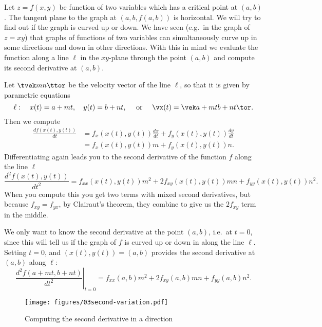 Let $z=f(x, y)$ be function of two variables which has a critical point at
$(a,b)$.  The tangent plane to the graph at $(a,b,f(a,b))$ is horizontal.
We will try to find out if the graph is curved up or down.  We have seen
(e.g.\ in the graph of $z=xy$) that graphs of functions of two variables
can simultaneously curve up in some directions and down in other
directions.
With this in mind we evaluate the function along a line $\ell$ in the
$xy$-plane through the point $(a,b)$ and compute its second derivative
at $(a,b)$.  

Let $\tvek m\\ n\ttor$ be the velocity vector of the line $\ell$, so that it
is given by parametric equations
\begin{equation}
  \ell:\quad
  x(t) = a+mt, \quad y(t) = b+nt,
  \quad \text{ or } \quad
  \vx(t) = \vek a+mt \\ b+nt\tor.
  \label{eq:line-through-critical-point}
\end{equation}
Then we compute
\begin{align*}
  \frac{d f(x(t), y(t))}{dt}
  &= f_x(x(t), y(t)) \frac{dx}{dt} + f_y(x(t), y(t)) \frac{dy}{dt}\\
  &=  f_x(x(t), y(t)) m + f_y(x(t), y(t)) n.
\end{align*}
Differentiating again leads you to the second derivative of the
function $f$ along the line $\ell$
\[
\frac{d^2 f(x(t), y(t))}{dt^2} 
=
f_{xx}(x(t), y(t)) m^2 + 2 f_{xy}(x(t), y(t)) mn + f_{yy}(x(t), y(t)) n^2.
\]
When you compute this you get two terms with mixed second derivatives,
but because $f_{xy} = f_{yx}$, by Clairaut's theorem, they combine to
give us the $2f_{xy}$ term in the middle.

We only want to know the second derivative at the point $(a,b)$, i.e.\
at $t=0$, since this will tell us if the graph of $f$ is curved up or
down in along the line $\ell$.  Setting $t=0$, and $(x(t), y(t)) =
(a,b)$ provides the second derivative at $(a,b)$ along $\ell$:
\begin{equation}
  \left.\frac{d^2 f(a+mt, b+nt)}{dt^2}\right|_{t=0} =
  f_{xx}(a,b) m^2 + 2f_{xy}(a,b) mn + f_{yy}(a,b)n^2.
  \label{eq:second-variation}
\end{equation}

\begin{figure}[htb]
  \centering
  \texttt{[image: figures/03second-variation.pdf]}
  \caption{Computing the second derivative in a direction}
  \label{fig:second-variation}
\end{figure}

